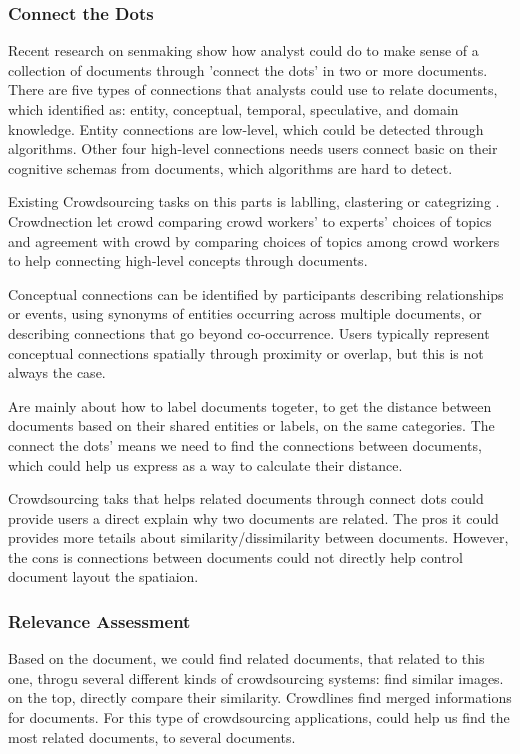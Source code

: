 \documentclass[journal]{vgtc}                %
\begin{document}
\subsubsection{Connect the Dots}

Recent research on senmaking show how analyst could do to make sense of a collection of documents through 'connect the dots' in two or more documents\cite{Bradel2013}. There are five types of connections that analysts could use to relate documents, which identified as: entity, conceptual, temporal, speculative, and domain knowledge. Entity connections are low-level, which could be detected through algorithms. Other four high-level connections needs users connect basic on their cognitive schemas from documents, which algorithms are hard to detect.

Existing Crowdsourcing tasks on this parts is lablling, clastering or categrizing .
Crowdnection\cite{} let crowd comparing crowd workers’ to experts’ choices of topics and agreement with crowd by comparing choices of topics among crowd workers to help connecting high-level concepts through documents.

Conceptual connections can be identified by participants describing relationships or events, using synonyms of entities occurring across multiple documents, or describing connections that go beyond co-occurrence. Users typically represent conceptual connections spatially through proximity or overlap, but this is not always the case.

Are mainly about how to label documents togeter, to get the distance between documents based on their shared entities or labels, on the same categories.
The connect the dots' means we need to find the connections between documents, which could help us express as a way to calculate their distance.

Crowdsourcing taks that helps related documents through connect dots could provide users a direct explain why two documents are related. The pros it could provides more tetails about similarity/dissimilarity between documents. However, the cons is connections between documents could not directly help control document layout the spatiaion.

\subsubsection{Relevance Assessment}

Based on the document, we could find related documents, that related to this one, throgu several different kinds of crowdsourcing systems: find similar images.
on the top, directly compare their similarity. Crowdlines \cite{} find merged informations for documents.
For this type of crowdsourcing applications, could help us find the most related documents, to several documents.
\end{document}

